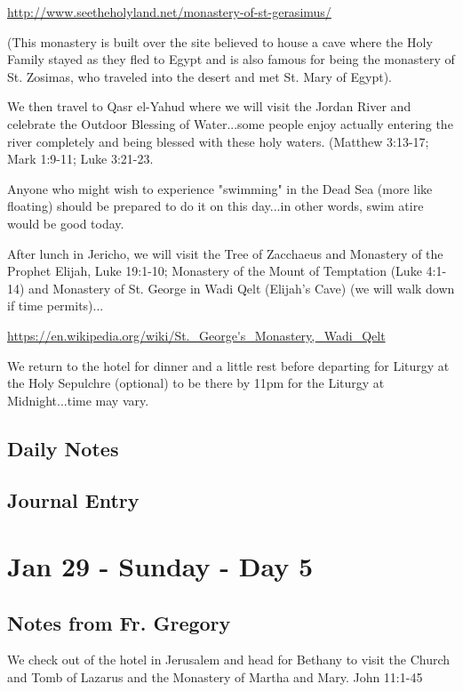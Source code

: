 \documentclass[letterpaper]{report}
\begin{document}
\url{http://www.seetheholyland.net/monastery-of-st-gerasimus/}

(This monastery is built over the site believed to house a cave where the Holy Family stayed as they fled to Egypt and is also famous for being the monastery of St. Zosimas, who traveled into the desert and met St. Mary of Egypt).

We then travel to Qasr el-Yahud where we will visit the Jordan River and celebrate the Outdoor Blessing of Water...some people enjoy actually entering the river completely and being blessed with these holy waters. (Matthew 3:13-17; Mark 1:9-11; Luke 3:21-23.

Anyone who might wish to experience "swimming" in the Dead Sea (more like floating) should be prepared to do it on this day...in other words, swim atire would be good today.

After lunch in Jericho, we will visit the Tree of Zacchaeus and Monastery of the Prophet Elijah, Luke 19:1-10; Monastery of the Mount of Temptation (Luke 4:1-14) and Monastery of St. George in Wadi Qelt (Elijah's Cave) (we will walk down if time permits)...

\url{https://en.wikipedia.org/wiki/St._George's_Monastery,_Wadi_Qelt}

We return to the hotel for dinner and a little rest before departing for Liturgy at the Holy Sepulchre (optional) to be there by 11pm for the Liturgy at Midnight...time may vary.

\subsection{Daily Notes}

\clearpage
\subsection{Journal Entry}

\clearpage
\section{Jan 29 - Sunday - Day 5}

\subsection{Notes from Fr. Gregory}
We check out of the hotel in Jerusalem and head for Bethany to visit the Church and Tomb of Lazarus and the Monastery of Martha and Mary. John 11:1-45
\end{document}
